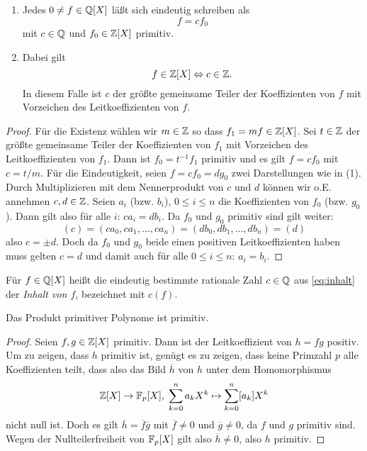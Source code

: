 \documentclass{book}
\begin{document}
\begin{lem}
    \label{lem:inhalt}
    \begin{enumerate}
        \item Jedes $0 \ne f \in \mathbb{Q}[X]$ läßt sich eindeutig schreiben als
                \begin{equation}
                    \label{eq:inhalt}
                    f = c f_0
                \end{equation}
            mit $c \in \mathbb{Q}$ und $f_0 \in \mathbb{Z}[X]$ primitiv. 
        \item Dabei gilt
            \[
                f \in \mathbb{Z}[X] \Leftrightarrow c \in \mathbb{Z}. 
            \]
            In diesem Falle ist $c$ der größte gemeinsame Teiler der
            Koeffizienten von $f$ mit Vorzeichen des Leitkoeffizienten von $f$.
    \end{enumerate}
\end{lem}
\begin{proof}
    Für die Existenz wählen wir $m \in \mathbb{Z}$ so dass $f_1 = m f \in \mathbb{Z}[X]$. Sei
    $t \in \mathbb{Z}$ der größte gemeinsame Teiler der Koeffizienten von $f_1$ mit
    Vorzeichen des Leitkoeffizienten von $f_1$. Dann ist $f_0 = t^{-1} f_1$
    primitiv und es gilt $f = c f_0$ mit $c = t/m$. 
    Für die Eindeutigkeit, seien $f = c f_0 = d g_0$ zwei Darstellungen wie in
    (1). Durch Multiplizieren mit dem Nennerprodukt von $c$ und $d$ können wir
    o.E. annehmen $c,d \in \mathbb{Z}$. Seien $a_i$ (bzw. $b_i$), $0 \le i \le n$ die
    Koeffizienten von $f_0$ (bzw. $g_0$). Dann gilt also für alle $i$: $c a_i =
    d b_i$. Da $f_0$ und $g_0$ primitiv sind gilt weiter:
    \[
        ( c ) = (ca_0,ca_1, ..., ca_n) = (db_0,db_1, ..., db_n) = ( d)
    \]
    also $c = \pm d$. Doch da $f_0$ und $g_0$ beide einen positiven
    Leitkoeffizienten haben muss gelten $c = d$ und damit auch für alle $0 \le
    i \le n$: $a_i = b_i$.
\end{proof}

\begin{term}
    \label{term:inhalt}
    Für $f \in \mathbb{Q}[X]$ heißt die eindeutig bestimmte rationale Zahl $c
    \in \mathbb{Q}$ aus \eqref{eq:inhalt} der \emph{Inhalt von $f$}, bezeichnet mit
    $c(f)$. 
\end{term}

\begin{lem}
    \label{lem:gauß}
    Das Produkt primitiver Polynome ist primitiv. 
\end{lem}
\begin{proof}
    Seien $f,g \in \mathbb{Z}[X]$ primitiv. Dann ist der Leitkoeffizient von $h = fg$
    positiv. Um zu zeigen, dass $h$ primitiv ist, genügt es zu zeigen, dass
    keine Primzahl $p$ alle Koeffizienten teilt, dass also das Bild $\overline{h}$ von $h$ 
    unter dem Homomorphismus 
    \[
        \mathbb{Z}[X] \to \mathbb{F}_p[X],\; \sum_{k=0}^n a_k X^k \mapsto \sum_{k=0}^n [ a_k ] X^k
    \]
    nicht null ist. Doch es gilt $\overline{h} = \overline{f}\overline{g}$ mit
    $\overline{f} \ne 0$ und $\overline{g} \ne 0$, da $f$ und $g$ primitiv
    sind. Wegen der Nullteilerfreiheit von $\mathbb{F}_p[X]$ gilt also $\overline{h}
    \ne 0$, also $h$ primitiv. 
\end{proof}
\end{document}

